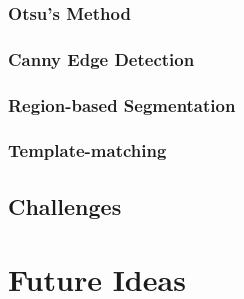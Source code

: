 \documentclass[]{article}
\begin{document}
\subsubsection*{Otsu's Method}
\subsubsection*{Canny Edge Detection}
\subsubsection*{Region-based Segmentation}
\subsubsection*{Template-matching}
\subsection*{Challenges}
\section*{Future Ideas}
\end{document}
